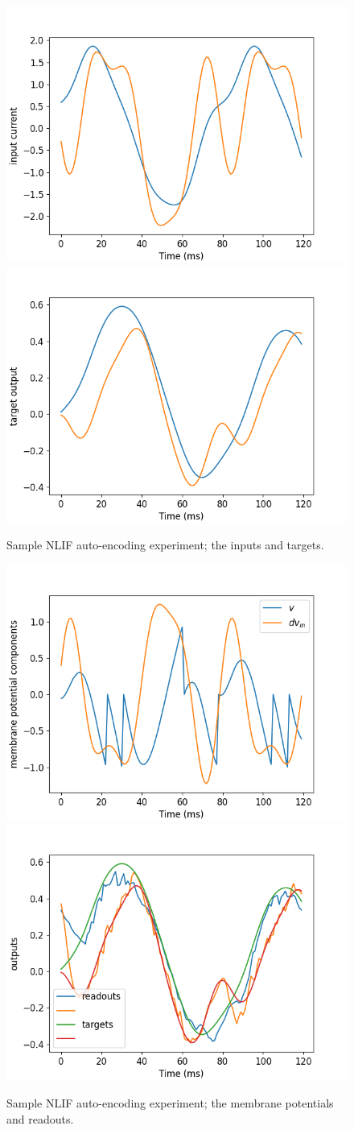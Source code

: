 \documentclass[mphil,deptreport,ianc]{infthesis} %
\begin{document}
\begin{figure}[!h]
    \centering
    \includegraphics[width=0.49\columnwidth]{figures/Supplementary/gating/NLIF/AutoEncoding/01-04_16-42-46-568/test_plot_inputs_NLIF_24.png}
    \includegraphics[width=0.49\columnwidth]{figures/Supplementary/gating/NLIF/AutoEncoding/01-04_16-42-46-568/test_plot_itargets_NLIF_24.png}
    \caption{Sample NLIF auto-encoding experiment; the inputs and targets.}
    \label{fig:NLIF_AE_1_inputs_targets}
\end{figure}

\begin{figure}[!h]
    \centering
    \includegraphics[width=0.49\columnwidth]{figures/Supplementary/gating/NLIF/AutoEncoding/01-04_16-42-46-568/test_plot_mem_voltage_single_neuron_NLIF_seed__24.png}
    \includegraphics[width=0.49\columnwidth]{figures/Supplementary/gating/NLIF/AutoEncoding/01-04_16-42-46-568/test_plot_outputs_NLIF_seed_24.png}
    \caption{Sample NLIF auto-encoding experiment; the membrane potentials and readouts.}
    \label{fig:NLIF_AE_1_inputs_targets}
\end{figure}
\end{document}

